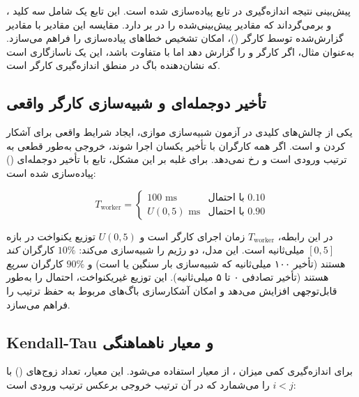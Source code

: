 پیش‌بینی نتیجه اندازه‌گیری در تابع  پیاده‌سازی شده است. این تابع یک  شامل سه کلید ،  و  برمی‌گرداند که مقادیر پیش‌بینی‌شده را در بر دارد. مقایسه این مقادیر با مقادیر گزارش‌شده توسط کارگر ()، امکان تشخیص خطاهای پیاده‌سازی را فراهم می‌سازد. به‌عنوان مثال، اگر کارگر  و  را گزارش دهد اما  با  متفاوت باشد، این یک ناسازگاری است که نشان‌دهنده باگ در منطق اندازه‌گیری کارگر است.

\subsection{تأخیر دوجمله‌ای و شبیه‌سازی کارگر واقعی}

یکی از چالش‌های کلیدی در آزمون شبیه‌سازی موازی، ایجاد شرایط واقعی برای آشکار کردن  و  است. اگر همه کارگران با تأخیر یکسان اجرا شوند، خروجی به‌طور قطعی به ترتیب ورودی است و  رخ نمی‌دهد. برای غلبه بر این مشکل، تابع  با تأخیر دوجمله‌ای () پیاده‌سازی شده است:

\begin{equation}
	T_{\text{worker}} = \begin{cases} 100 \text{ ms} & \text{با احتمال } 0.10 \\ U(0, 5) \text{ ms} & \text{با احتمال } 0.90 \end{cases}
\end{equation}

در این رابطه، $T_{\text{worker}}$ زمان اجرای کارگر است و $U(0, 5)$ توزیع یکنواخت در بازه $[0, 5]$ میلی‌ثانیه است. این مدل، دو رژیم را شبیه‌سازی می‌کند: $10\%$ کارگران \emph{کند} هستند (تأخیر ۱۰۰ میلی‌ثانیه که شبیه‌سازی بار  سنگین یا  است) و $90\%$ کارگران \emph{سریع} هستند (تأخیر تصادفی ۰ تا ۵ میلی‌ثانیه). این توزیع غیریکنواخت، احتمال  را به‌طور قابل‌توجهی افزایش می‌دهد و امکان آشکارسازی باگ‌های مربوط به حفظ ترتیب را فراهم می‌سازد.

\subsection{ Kendall-Tau و معیار ناهماهنگی}

برای اندازه‌گیری کمی میزان ، از معیار  استفاده می‌شود. این معیار، تعداد زوج‌های () با $i < j$ را می‌شمارد که در آن ترتیب خروجی برعکس ترتیب ورودی است:

